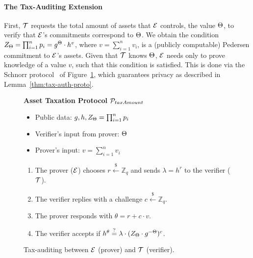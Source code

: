 \paragraph{The Tax-Auditing Extension}\label{subsec:tax-authority-proto}
First, $\mathcal{T}$ requests the total amount of assets that $\mathcal{E}$
controls, \ie the value $\Theta$, to verify that $\mathcal{E}$'s commitments
correspond to $\Theta$. We obtain the condition
$Z_\Theta = \prod_{i = 1}^n p_i = g^{\Theta} \cdot h^v$,
where $v = {\sum_{i = 1}^n v_i}$, is a (publicly
computable) Pedersen commitment to $\mathcal{E}$'s assets. Given that $\mathcal{T}$
knows $\Theta$, $\mathcal{E}$ needs only to prove knowledge of a value $v$, such
that this condition is satisfied. This is done via the Schnorr
protocol~\cite{C:Schnorr89} of Figure~\ref{fig:taxation_auth_proto}, which
guarantees privacy as described in Lemma~\ref{thm:tax-auth-proto}.

\begin{figure}[h]
\begin{mdframed}

\begin{center}
    \textbf{Asset Taxation Protocol} $\mathcal{P}_{taxAmount}$
\end{center}

    \begin{itemize}
        \item Public data: $g, h, Z_\Theta = \prod_{i = 1}^n p_i$
        \item Verifier's input from prover: $\Theta$
        \item Prover's input: $v = \sum_{i = 1}^n v_i$
    \end{itemize}

    \begin{enumerate}
        \item The prover ($\mathcal{E}$) chooses $r \xleftarrow{\$} \mathbb{Z}_q$
            and sends $\lambda = h^r$ to the verifier ($\mathcal{T}$).
        \item The verifier replies with a challenge $c \xleftarrow{\$} \mathbb{Z}_q$.
        \item The prover responds with $\theta = r + c \cdot v$.
        \item The verifier accepts if $h^\theta \stackrel{?}{=} \lambda \cdot (Z_\Theta \cdot g^{-\Theta})^c$.
    \end{enumerate}

\end{mdframed}
\caption{
    Tax-auditing between $\mathcal{E}$ (prover) and $\mathcal{T}$ (verifier).
}
\label{fig:taxation_auth_proto}
\end{figure}

